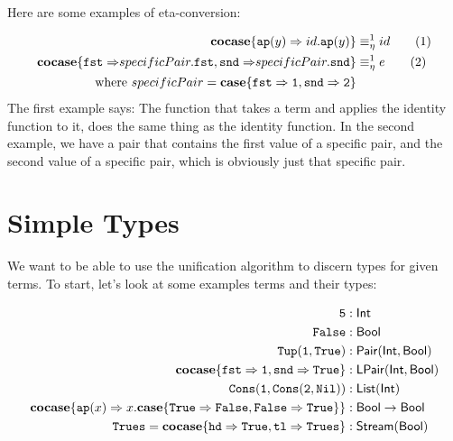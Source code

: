 \documentclass[twoside,12pt,a4paper]{article}
\begin{document}
Here are some examples of eta-conversion:
\begin{example}
    \begin{align*}
        \textbf{cocase}\{\texttt{ap}(y)\Rightarrow id.\texttt{ap}(y)\}&\equiv_{\eta}^1 id\tag{1}\\
        \textbf{cocase}\{\mathtt{fst\Rightarrow} specificPair.\mathtt{fst}, \mathtt{snd\Rightarrow}specificPair.\mathtt{snd}\}&\equiv_{\eta}^1 e  \tag{2}\\      
        \text{where } specificPair = \textbf{case}\{\mathtt{fst\Rightarrow 1, snd\Rightarrow 2}\}
    \end{align*} %
    The first example says: The function that takes a term and applies the identity function to it, does the same thing as the identity function.
    In the second example, we have a pair that contains the first value of a specific pair, and the second value of a specific pair, which is obviously just that specific pair.    
\end{example}    
    
\section{Simple Types}\label{sec:Simple Types}

We want to be able to use the unification algorithm to discern types for given terms. 
To start, let's look at some examples terms and their types:

\begin{example}
    \begin{align*}
        \mathtt{5}&: \mathsf{Int}\\
        \mathtt{False}&: \mathsf{Bool}\\
        \mathtt{Tup(1,True)}&: \mathsf{Pair(Int, Bool)}\\
        \textbf{cocase}\{\mathtt{fst \Rightarrow 1, snd\Rightarrow True}\}&: \mathsf{LPair(Int, Bool)}\\
        \mathtt{Cons(1, Cons(2, Nil))}&: \mathsf{List(Int)}\\
        \textbf{cocase}\{\texttt{ap}(x)\Rightarrow x.\textbf{case}\{\mathtt{True\Rightarrow False, False \Rightarrow True}\}\}&: \mathsf{Bool \rightarrow Bool}\\
        \mathtt{Trues} = \textbf{cocase}\{\mathtt{hd \Rightarrow True, tl \Rightarrow Trues}\}&: \mathsf{Stream(Bool)}\\
    \end{align*}    
\end{example}
\end{document}
